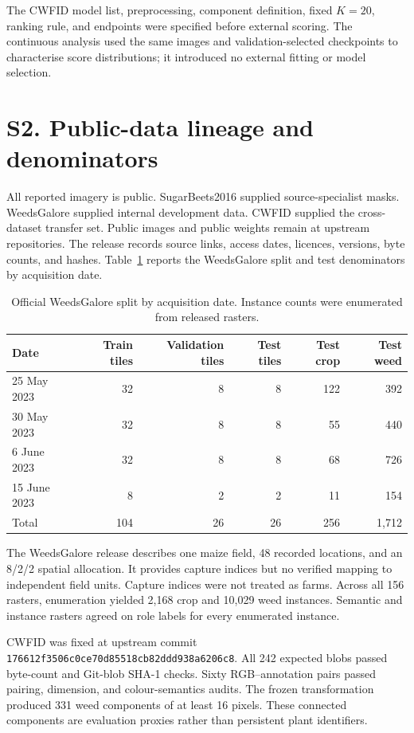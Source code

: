 \documentclass[preprint,12pt]{elsarticle}
\begin{document}
The CWFID model list, preprocessing, component definition, fixed $K=20$, ranking rule, and endpoints were specified before external scoring. The continuous analysis used the same images and validation-selected checkpoints to characterise score distributions; it introduced no external fitting or model selection.

\section{S2. Public-data lineage and denominators}

All reported imagery is public. SugarBeets2016 supplied source-specialist masks. WeedsGalore supplied internal development data. CWFID supplied the cross-dataset transfer set. Public images and public weights remain at upstream repositories. The release records source links, access dates, licences, versions, byte counts, and hashes. Table~\ref{tab:s2split} reports the WeedsGalore split and test denominators by acquisition date.

\begin{table}[htbp]
\centering
\caption{Official WeedsGalore split by acquisition date. Instance counts were enumerated from released rasters.}
\label{tab:s2split}
\small
\setlength{\tabcolsep}{5pt}
\begin{tabular}{lrrrrr}
\toprule
Date & Train tiles & Validation tiles & Test tiles & Test crop & Test weed \\
\midrule
25 May 2023 & 32 & 8 & 8 & 122 & 392 \\
30 May 2023 & 32 & 8 & 8 & 55 & 440 \\
6 June 2023 & 32 & 8 & 8 & 68 & 726 \\
15 June 2023 & 8 & 2 & 2 & 11 & 154 \\
\midrule
Total & 104 & 26 & 26 & 256 & 1,712 \\
\bottomrule
\end{tabular}
\end{table}

The WeedsGalore release describes one maize field, 48 recorded locations, and an 8/2/2 spatial allocation. It provides capture indices but no verified mapping to independent field units. Capture indices were not treated as farms. Across all 156 rasters, enumeration yielded 2,168 crop and 10,029 weed instances. Semantic and instance rasters agreed on role labels for every enumerated instance.

CWFID was fixed at upstream commit \nolinkurl{176612f3506c0ce70d85518cb82ddd938a6206c8}. All 242 expected blobs passed byte-count and Git-blob SHA-1 checks. Sixty RGB--annotation pairs passed pairing, dimension, and colour-semantics audits. The frozen transformation produced 331 weed components of at least 16 pixels. These connected components are evaluation proxies rather than persistent plant identifiers.
\end{document}
